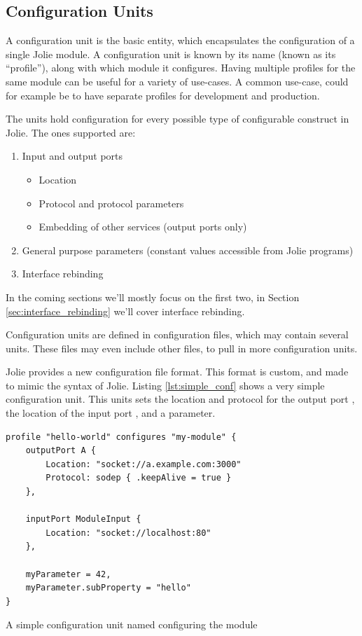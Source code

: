 \subsection{Configuration Units}
\label{sec:conf_units}

A configuration unit is the basic entity, which encapsulates the configuration
of a single Jolie module. A configuration unit is known by its name (known as
its ``profile''), along with which module it configures. Having multiple profiles
for the same module can be useful for a variety of use-cases. A common
use-case, could for example be to have separate profiles for development and
production.

The units hold configuration for every possible type of configurable construct
in Jolie. The ones supported are:

\begin{enumerate}
    \item Input and output ports
        \begin{itemize}
            \item Location
            \item Protocol and protocol parameters
            \item Embedding of other services (output ports only)
        \end{itemize}
    \item General purpose parameters (constant values accessible from
            Jolie programs)
    \item Interface rebinding
\end{enumerate}

In the coming sections we'll mostly focus on the first two, in Section
\ref{sec:interface_rebinding} we'll cover interface rebinding.

Configuration units are defined in configuration files, which may contain
several units. These files may even include other files, to pull in more
configuration units.

Jolie provides a new configuration file format. This format is custom, and made
to mimic the syntax of Jolie. Listing \ref{lst:simple_conf} shows a very
simple configuration unit. This units sets the location and protocol for the
output port , the location of the input port
, and a parameter.

\begin{listing}[H]
\begin{verbatim}
profile "hello-world" configures "my-module" {
    outputPort A {
        Location: "socket://a.example.com:3000"
        Protocol: sodep { .keepAlive = true }
    },

    inputPort ModuleInput {
        Location: "socket://localhost:80"
    },

    myParameter = 42,
    myParameter.subProperty = "hello"
}
\end{verbatim}

\caption{A simple configuration unit named 
    configuring the module }

\label{lst:simple_conf}

\end{listing}

